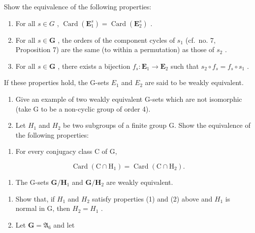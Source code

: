 Show the equivalence of the following properties:

\begin{enumerate}
\def\labelenumi{(\roman{enumi})}
\item
  For all \(s \in G\) , \(\operatorname{Card}(\mathbf{E}_1^s) = \operatorname{Card}(\mathbf{E}_2^s)\) .
\item
  For all \(s \in \mathbf{G}\) , the orders of the component cycles of \(s_1\) (cf.~no. 7, Proposition 7) are the same (to within a permutation) as those of \(s_2\) .
\item
  For all \(s \in \mathbf{G}\) , there exists a bijection \(f_s: \mathbf{E}_1 \to \mathbf{E}_2\) such that \(s_2 \circ f_s = f_s \circ s_1\) .
\end{enumerate}

If these properties hold, the G-sets \(E_{1}\) and \(E_{2}\) are said to be weakly equivalent.

\begin{enumerate}
\def\labelenumi{(\alph{enumi})}
\setcounter{enumi}{1}
\item
  Give an example of two weakly equivalent G-sets which are not isomorphic (take G to be a non-cyclic group of order 4).
\item
  Let \(H_{1}\) and \(H_{2}\) be two subgroups of a finite group G. Show the equivalence of the following properties:
\end{enumerate}

\begin{enumerate}
\def\labelenumi{(\arabic{enumi})}
\tightlist
\item
  For every conjugacy class C of G,
\end{enumerate}

\[
\operatorname{Card} (\mathrm{C} \cap \mathrm{H} _ {1}) = \operatorname{Card} (\mathrm{C} \cap \mathrm{H} _ {2}).
\]

\begin{enumerate}
\def\labelenumi{(\arabic{enumi})}
\setcounter{enumi}{1}
\tightlist
\item
  The G-sets \(\mathbf{G} / \mathbf{H}_1\) and \(\mathbf{G} / \mathbf{H}_2\) are weakly equivalent.
\end{enumerate}

\begin{enumerate}
\def\labelenumi{(\alph{enumi})}
\setcounter{enumi}{3}
\item
  Show that, if \(H_{1}\) and \(H_{2}\) satisfy properties (1) and (2) above and \(H_{1}\) is normal in G, then \(H_{2} = H_{1}\) .
\item
  Let \(\mathbf{G} = \mathfrak{A}_6\) and let
\end{enumerate}

